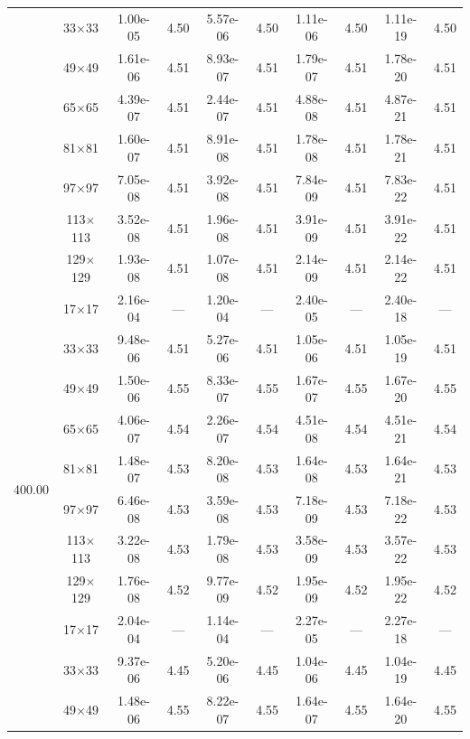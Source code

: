 \begin{table}[H]
{\begin{tabular*}{\textwidth}{@{\extracolsep\fill}c|c|cc|cc|cc|cc@{}}
                & 33$\times$33 & 1.00e-05 & 4.50 & 5.57e-06 & 4.50 & 1.11e-06 & 4.50 & 1.11e-19 & 4.50 \\
                & 49$\times$49 & 1.61e-06 & 4.51 & 8.93e-07 & 4.51 & 1.79e-07 & 4.51 & 1.78e-20 & 4.51 \\
                & 65$\times$65 & 4.39e-07 & 4.51 & 2.44e-07 & 4.51 & 4.88e-08 & 4.51 & 4.87e-21 & 4.51 \\
                & 81$\times$81 & 1.60e-07 & 4.51 & 8.91e-08 & 4.51 & 1.78e-08 & 4.51 & 1.78e-21 & 4.51 \\
                & 97$\times$97 & 7.05e-08 & 4.51 & 3.92e-08 & 4.51 & 7.84e-09 & 4.51 & 7.83e-22 & 4.51 \\
                & 113$\times$113 & 3.52e-08 & 4.51 & 1.96e-08 & 4.51 & 3.91e-09 & 4.51 & 3.91e-22 & 4.51 \\
                & 129$\times$129 & 1.93e-08 & 4.51 & 1.07e-08 & 4.51 & 2.14e-09 & 4.51 & 2.14e-22 & 4.51 \\
                \midrule
                \multirow{10}{*}{400.00} & 17$\times$17 & 2.16e-04 & --- & 1.20e-04 & --- & 2.40e-05 & --- & 2.40e-18 & --- \\
                & 33$\times$33 & 9.48e-06 & 4.51 & 5.27e-06 & 4.51 & 1.05e-06 & 4.51 & 1.05e-19 & 4.51 \\
                & 49$\times$49 & 1.50e-06 & 4.55 & 8.33e-07 & 4.55 & 1.67e-07 & 4.55 & 1.67e-20 & 4.55 \\
                & 65$\times$65 & 4.06e-07 & 4.54 & 2.26e-07 & 4.54 & 4.51e-08 & 4.54 & 4.51e-21 & 4.54 \\
                & 81$\times$81 & 1.48e-07 & 4.53 & 8.20e-08 & 4.53 & 1.64e-08 & 4.53 & 1.64e-21 & 4.53 \\
                & 97$\times$97 & 6.46e-08 & 4.53 & 3.59e-08 & 4.53 & 7.18e-09 & 4.53 & 7.18e-22 & 4.53 \\
                & 113$\times$113 & 3.22e-08 & 4.53 & 1.79e-08 & 4.53 & 3.58e-09 & 4.53 & 3.57e-22 & 4.53 \\
                & 129$\times$129 & 1.76e-08 & 4.52 & 9.77e-09 & 4.52 & 1.95e-09 & 4.52 & 1.95e-22 & 4.52 \\
                \midrule
                \multirow{10}{*}{1000.00} & 17$\times$17 & 2.04e-04 & --- & 1.14e-04 & --- & 2.27e-05 & --- & 2.27e-18 & --- \\
                & 33$\times$33 & 9.37e-06 & 4.45 & 5.20e-06 & 4.45 & 1.04e-06 & 4.45 & 1.04e-19 & 4.45 \\
                & 49$\times$49 & 1.48e-06 & 4.55 & 8.22e-07 & 4.55 & 1.64e-07 & 4.55 & 1.64e-20 & 4.55 \\

\end{tabular*}}
\end{table}
